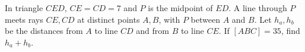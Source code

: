 In triangle $CED$, $CE=CD=7$ and $P$ is the midpoint of $ED$. A line through $P$ meets rays $CE,CD$ at distinct points $A,B$, with $P$ between $A$ and $B$. Let $h_a,h_b$ be the distances from $A$ to line $CD$ and from $B$ to line $CE$. If $[ABC]=35$, find $h_a+h_b$.
